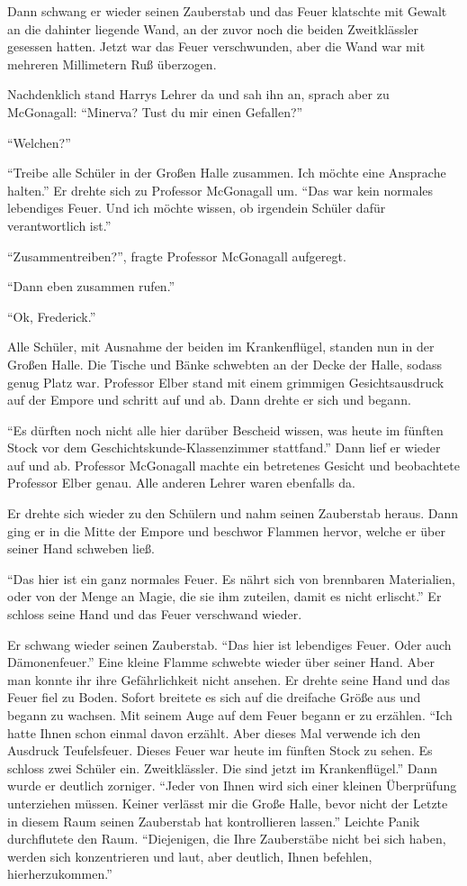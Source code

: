 Dann schwang er wieder seinen Zauberstab und das Feuer klatschte mit Gewalt an die dahinter liegende Wand, an der zuvor noch die beiden Zweitklässler gesessen hatten. Jetzt war das Feuer verschwunden, aber die Wand war mit mehreren Millimetern Ruß überzogen.

Nachdenklich stand Harrys Lehrer da und sah ihn an, sprach aber zu McGonagall: \enquote{Minerva? Tust du mir einen Gefallen?}

\enquote{Welchen?}

\enquote{Treibe alle Schüler in der Großen Halle zusammen. Ich möchte eine Ansprache halten.} Er drehte sich zu Professor McGonagall um. \enquote{Das war kein normales lebendiges Feuer. Und ich möchte wissen, ob irgendein Schüler dafür verantwortlich ist.}

\enquote{Zusammentreiben?}, fragte Professor McGonagall aufgeregt.

\enquote{Dann eben zusammen rufen.}

\enquote{Ok, Frederick.}

Alle Schüler, mit Ausnahme der beiden im Krankenflügel, standen nun in der Großen Halle. Die Tische und Bänke schwebten an der Decke der Halle, sodass genug Platz war. Professor Elber stand mit einem grimmigen Gesichtsausdruck auf der Empore und schritt auf und ab. Dann drehte er sich und begann.

\enquote{Es dürften noch nicht alle hier darüber Bescheid wissen, was heute im fünften Stock vor dem Ge\-schichts\-kun\-de-Klas\-sen\-zim\-mer stattfand.} Dann lief er wieder auf und ab. Professor McGonagall machte ein betretenes Gesicht und beobachtete Professor Elber genau. Alle anderen Lehrer waren ebenfalls da.

Er drehte sich wieder zu den Schülern und nahm seinen Zauberstab heraus. Dann ging er in die Mitte der Empore und beschwor Flammen hervor, welche er über seiner Hand schweben ließ.

\enquote{Das hier ist ein ganz normales Feuer. Es nährt sich von brennbaren Materialien, oder von der Menge an Magie, die sie ihm zuteilen, damit es nicht erlischt.} Er schloss seine Hand und das Feuer verschwand wieder.

Er schwang wieder seinen Zauberstab. \enquote{Das hier ist lebendiges Feuer. Oder auch Dämonenfeuer.} Eine kleine Flamme schwebte wieder über seiner Hand. Aber man konnte ihr ihre Gefährlichkeit nicht ansehen. Er drehte seine Hand und das Feuer fiel zu Boden. Sofort breitete es sich auf die dreifache Größe aus und begann zu wachsen. Mit seinem Auge auf dem Feuer begann er zu erzählen. \enquote{Ich hatte Ihnen schon einmal davon erzählt. Aber dieses Mal verwende ich den Ausdruck Teufelsfeuer. \gst Dieses Feuer war heute im fünften Stock zu sehen. Es schloss zwei Schüler ein. Zweitklässler. Die sind jetzt im Krankenflügel.} Dann wurde er deutlich zorniger. \enquote{Jeder von Ihnen wird sich einer kleinen Überprüfung unterziehen müssen. Keiner verlässt mir die Große Halle, bevor nicht der Letzte in diesem Raum seinen Zauberstab hat kontrollieren lassen.} Leichte Panik durchflutete den Raum. \enquote{Diejenigen, die Ihre Zauberstäbe nicht bei sich haben, werden sich konzentrieren und laut, aber deutlich, Ihnen befehlen, hierherzukommen.}

